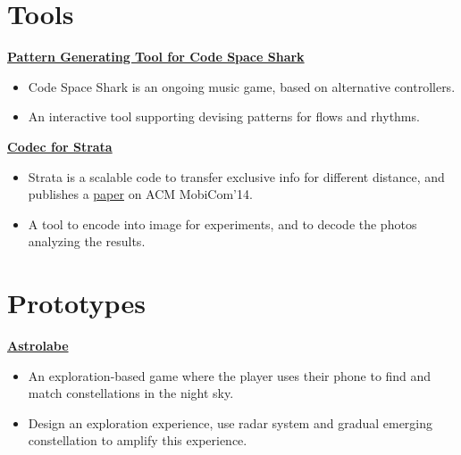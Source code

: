 \documentclass{article}
\begin{document}
{		\section{Tools}
		\vspace{5pt}

	
		\textbf{\href{http://www.plutoshe.com/blog/PatternGenerator}{Pattern Generating Tool for Code Space Shark}} \hfill \quad
		
		\begin{itemize}
			\item Code Space Shark is an ongoing music game, based on alternative controllers.
			\item An interactive tool supporting devising patterns for flows and rhythms.
			
			
		\end{itemize}
	
		\textbf{\href{http://www.plutoshe.com/blog/Strata}{Codec for Strata}} \hfill \quad
	
		\begin{itemize}
			\item Strata is a scalable code to transfer exclusive info for different distance, and publishes a \href{https://www.eng.yale.edu/wenjun/papers/strata.pdf}{paper} on ACM MobiCom'14.
			\item A tool to encode into image for experiments, and to decode the photos analyzing the results. 
			
		\end{itemize}
		
		\section{Prototypes}
		\vspace{5pt}
		\textbf{\href{http://www.plutoshe.com/blog/Astrolabe}{Astrolabe}} \hfill \quad
		
		\begin{itemize}
			\item An exploration-based game where the player uses their phone to find and match constellations in the night sky.
			\item Design an exploration experience, use radar system and gradual emerging constellation to amplify this experience.
			

\end{itemize}}
\end{document}
